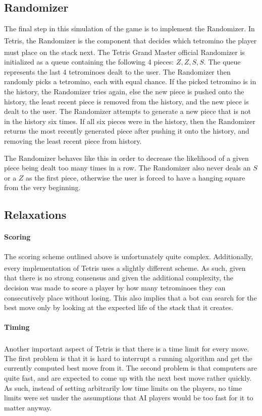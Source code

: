 \documentclass[fontsize=12pt]{article}
\def\tetris{Tetris\textsuperscript{\textregistered}}
\begin{document}
\subsection{Randomizer}
\label{sub:randomizer}
\par The final step in this simulation of the game is to implement the Randomizer. In \tetris{}, the Randomizer is the component that decides which tetromino the player must place on the stack next. The \tetris{} Grand Master official \cite{bib:TGMRandomizer} Randomizer is initialized as a queue containing the following 4 pieces: $Z,Z,S,S$. The queue represents the last 4 tetrominoes dealt to the user. The Randomizer then randomly picks a tetromino, each with equal chance. If the picked tetromino is in the history, the Randomizer tries again, else the new piece is pushed onto the history, the least recent piece is removed from the history, and the new piece is dealt to the user. The Randomizer attempts to generate a new piece that is not in the history six times. If all six pieces were in the history, then the Randomizer returns the most recently generated piece after pushing it onto the history, and removing the least recent piece from history.
\par The Randomizer behaves like this in order to decrease the likelihood of a given piece being dealt too many times in a row. The Randomizer also never deals an $S$ or a $Z$ as the first piece, otherwise the user is forced to have a hanging square from the very beginning.

\subsection{Relaxations}
\label{sub:relaxations}
\paragraph{Scoring}
\label{par:scoring}
The scoring scheme outlined above is unfortunately quite complex. Additionally, every implementation of \tetris{} uses a slightly different scheme. As such, given that there is no strong consensus and given the additional complexity, the decision was made to score a player by how many tetrominoes they can consecutively place without losing. This also implies that a bot can search for the best move only by looking at the expected life of the stack that it creates.
\paragraph{Timing}
\label{par:timing}
Another important aspect of \tetris{} is that there is a time limit for every move. The first problem is that it is hard to interrupt a running algorithm and get the currently computed best move from it. The second problem is that computers are quite fast, and are expected to come up with the next best move rather quickly. As such, instead of setting arbitrarily low time limits on the players, no time limits were set under the assumptions that AI players would be too fast for it to matter anyway.
\end{document}
